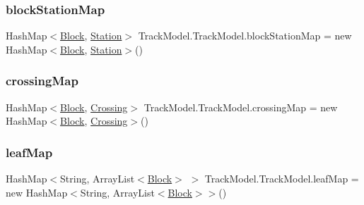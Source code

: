\subsubsection{\texorpdfstring{block\+Station\+Map}{blockStationMap}}
{\footnotesize\ttfamily Hash\+Map$<$\hyperlink{classTrackModel_1_1Block}{Block}, \hyperlink{classTrackModel_1_1Station}{Station}$>$ Track\+Model.\+Track\+Model.\+block\+Station\+Map = new Hash\+Map$<$\hyperlink{classTrackModel_1_1Block}{Block}, \hyperlink{classTrackModel_1_1Station}{Station}$>$()\hspace{0.3cm}{\ttfamily [package]}}

\mbox{\label{classTrackModel_1_1TrackModel_a3615fcccbc32c0bc531e67e9fcd8f51e}} 
\subsubsection{\texorpdfstring{crossing\+Map}{crossingMap}}
{\footnotesize\ttfamily Hash\+Map$<$\hyperlink{classTrackModel_1_1Block}{Block}, \hyperlink{classTrackModel_1_1Crossing}{Crossing}$>$ Track\+Model.\+Track\+Model.\+crossing\+Map = new Hash\+Map$<$\hyperlink{classTrackModel_1_1Block}{Block}, \hyperlink{classTrackModel_1_1Crossing}{Crossing}$>$()\hspace{0.3cm}{\ttfamily [package]}}

\mbox{\label{classTrackModel_1_1TrackModel_aaba2349b7ccd094c05ad27c241143e4c}} 
\subsubsection{\texorpdfstring{leaf\+Map}{leafMap}}
{\footnotesize\ttfamily Hash\+Map$<$String, Array\+List$<$\hyperlink{classTrackModel_1_1Block}{Block}$>$ $>$ Track\+Model.\+Track\+Model.\+leaf\+Map = new Hash\+Map$<$String, Array\+List$<$\hyperlink{classTrackModel_1_1Block}{Block}$>$$>$()\hspace{0.3cm}{\ttfamily [package]}}

\mbox{\label{classTrackModel_1_1TrackModel_ae48e24ae7b5775111086a3b3734d8dc9}} 
